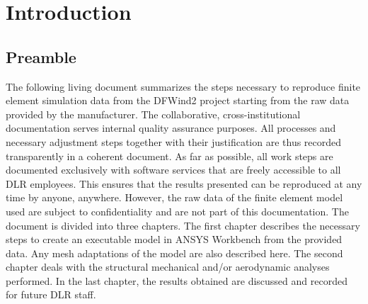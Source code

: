 \chapter{Introduction}

\section{Preamble}
The following living document summarizes the steps necessary to reproduce finite element simulation data from the DFWind2 project starting from the raw data provided by the manufacturer. The collaborative, cross-institutional documentation serves internal quality assurance purposes. All processes and necessary adjustment steps together with their justification are thus recorded transparently in a coherent document. As far as possible, all work steps are documented exclusively with software services that are freely accessible to all DLR employees. This ensures that the results presented can be reproduced at any time by anyone, anywhere. However, the raw data of the finite element model used are subject to confidentiality and are not part of this documentation. 
The document is divided into three chapters. The first chapter describes the necessary steps to create an executable model in ANSYS Workbench from the provided data. Any mesh adaptations of the model are also described here. The second chapter deals with the structural mechanical and/or aerodynamic analyses performed. In the last chapter, the results obtained are discussed and recorded for future DLR staff.
